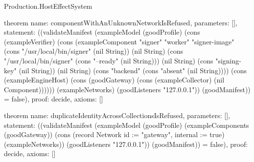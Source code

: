 \begin{lexlean}{Production.HostEffectSystem}
\begin{semanticmodule}
theorem{
  name: componentWithAnUnknownNetworkIsRefused,
  parameters: [],
  statement: ((validateManifest (exampleModel (goodProfile) (cons (exampleVerifier) (cons (exampleComponent "signer" "worker" "signer-image" (cons "/usr/local/bin/signer" (nil String)) (nil String) (cons "/usr/local/bin/signer" (cons "--ready" (nil String))) (nil String) (cons "signing-key" (nil String)) (nil String) (cons "backend" (cons "absent" (nil String)))) (cons (exampleEngineHost) (cons (goodGateway) (cons (exampleCollector) (nil Component)))))) (exampleNetworks) (goodListeners "127.0.0.1")) (goodManifest)) = false),
  proof: decide{},
  axioms: []
}

theorem{
  name: duplicateIdentityAcrossCollectionsIsRefused,
  parameters: [],
  statement: ((validateManifest (exampleModel (goodProfile) (exampleComponents (goodGateway)) (cons (record Network {id := "gateway", internal := true}) (exampleNetworks)) (goodListeners "127.0.0.1")) (goodManifest)) = false),
  proof: decide{},
  axioms: []
}
\end{semanticmodule}
\end{lexlean}
